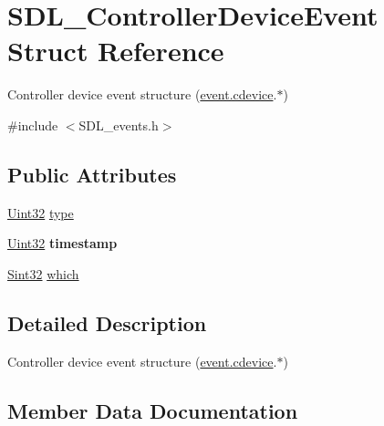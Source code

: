 \hypertarget{struct_s_d_l___controller_device_event}{}\section{S\+D\+L\+\_\+\+Controller\+Device\+Event Struct Reference}
\label{struct_s_d_l___controller_device_event}


Controller device event structure (\hyperlink{union_s_d_l___event_ad3beed01e690b885728e0b0e1d636378}{event.\+cdevice}.$\ast$)  




{\ttfamily \#include $<$S\+D\+L\+\_\+events.\+h$>$}

\subsection*{Public Attributes}
\begin{DoxyCompactItemize}
\item 
\hyperlink{_s_d_l__stdinc_8h_add440eff171ea5f55cb00c4a9ab8672d}{Uint32} \hyperlink{struct_s_d_l___controller_device_event_a45b3807eaf70a5f5cf712455da277536}{type}
\item 
\hypertarget{struct_s_d_l___controller_device_event_a62945795fc17f5000fddc80e2cf921b8}{}\hyperlink{_s_d_l__stdinc_8h_add440eff171ea5f55cb00c4a9ab8672d}{Uint32} {\bfseries timestamp}\label{struct_s_d_l___controller_device_event_a62945795fc17f5000fddc80e2cf921b8}

\item 
\hyperlink{_s_d_l__stdinc_8h_a7a90b941db9d4582e9ad7abb9940ff7e}{Sint32} \hyperlink{struct_s_d_l___controller_device_event_accb80de1619c1e790cffb6c888c915db}{which}
\end{DoxyCompactItemize}


\subsection{Detailed Description}
Controller device event structure (\hyperlink{union_s_d_l___event_ad3beed01e690b885728e0b0e1d636378}{event.\+cdevice}.$\ast$) 

\subsection{Member Data Documentation}
\hypertarget{struct_s_d_l___controller_device_event_a45b3807eaf70a5f5cf712455da277536}{}
